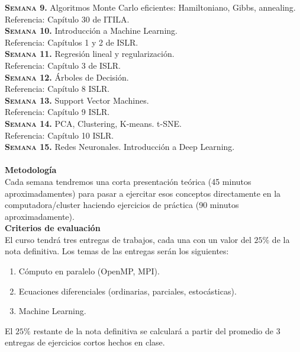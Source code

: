\documentclass[letterpaper,10pt,onecolumn]{article}
\begin{document}
\noindent\textbf{\textsc{Semana 9.}}
Algoritmos Monte Carlo eficientes: Hamiltoniano, Gibbs, annealing. \\
Referencia: Cap\'itulo 30 de ITILA.
\\[-0.3cm] 

\noindent\textbf{\textsc{Semana 10.}}  
Introducci\'on a Machine Learning. \\
Referencia: Cap\'itulos 1 y 2 de ISLR.
\\[-0.3cm] 

\noindent\textbf{\textsc{Semana 11.}}  
Regresi\'on lineal y regularizaci\'on.\\
Referencia: Cap\'itulo 3 de ISLR.
\\[-0.3cm]

\noindent\textbf{\textsc{Semana 12.}} 
\'Arboles de Decisi\'on.\\
Referencia: Cap\'itulo 8 ISLR. 
\\[-0.3cm]  

\noindent\textbf{\textsc{Semana 13.}} 
Support Vector Machines.\\
Referencia: Cap\'itulo 9 ISLR.
\\[-0.3cm] 

\noindent\textbf{\textsc{Semana 14.}} 
PCA, Clustering, K-means. t-SNE.\\
Referencia: Cap\'itulo 10 ISLR. 
\\[-0.3cm] 

\noindent\textbf{\textsc{Semana 15.}} 
Redes Neuronales. Introducci\'on a Deep Learning.\\
\\[-0.1cm]  


\noindent\textbf{\large {} \quad
  Metodolog\'ia}\\[-0.2cm] 


\noindent\normalsize Cada semana tendremos una corta presentaci\'on
te\'orica (45 minutos aproximadamentes) para pasar a ejercitar esos
conceptos directamente en la computadora/cluster haciendo
ejercicios de pr\'actica (90 minutos aproximadamente). \\[0.1cm]


\noindent\textbf{\large {} \quad Criterios de
  evaluaci\'on}\\[-0.2cm] 


El curso tendr\'a tres entregas de trabajos, cada una con un valor
del $25\%$ de la nota definitiva. Los temas de las entregas ser\'an
los siguientes:
\begin{enumerate}
\item C\'omputo en paralelo (OpenMP, MPI).\\[-0.6cm]
\item Ecuaciones diferenciales (ordinarias, parciales, estoc\'asticas).\\[-0.6cm]
\item Machine Learning.\\[-0.2cm]
\end{enumerate}
\noindent
El $25\%$ restante de la nota definitiva se calcular\'a a partir del
promedio de $3$ entregas de ejercicios cortos hechos en clase. 
\end{document}

